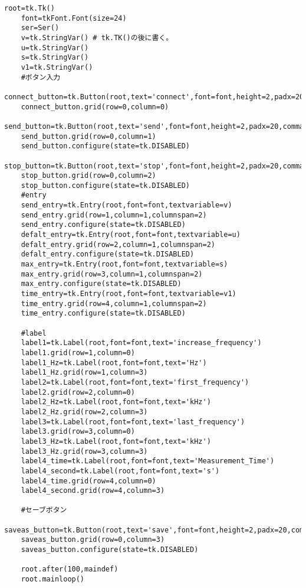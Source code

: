 \documentclass[12pt]{jarticle}
\begin{document}
\begin{lstlisting}[caption = GUIプログラム , label = program1]
	root=tk.Tk()
	font=tkFont.Font(size=24)
	ser=Ser() 
	v=tk.StringVar() # tk.TK()の後に書く。
	u=tk.StringVar()
	s=tk.StringVar()
	v1=tk.StringVar()
	#ボタン入力
	connect_button=tk.Button(root,text='connect',font=font,height=2,padx=20,command=ser.connect)
	connect_button.grid(row=0,column=0)
	send_button=tk.Button(root,text='send',font=font,height=2,padx=20,command=ser.send_com)
	send_button.grid(row=0,column=1)
	send_button.configure(state=tk.DISABLED)
	stop_button=tk.Button(root,text='stop',font=font,height=2,padx=20,command=ser.stop_com)
	stop_button.grid(row=0,column=2)
	stop_button.configure(state=tk.DISABLED)
	#entry
	send_entry=tk.Entry(root,font=font,textvariable=v)
	send_entry.grid(row=1,column=1,columnspan=2)
	send_entry.configure(state=tk.DISABLED)
	defalt_entry=tk.Entry(root,font=font,textvariable=u)
	defalt_entry.grid(row=2,column=1,columnspan=2)
	defalt_entry.configure(state=tk.DISABLED)
	max_entry=tk.Entry(root,font=font,textvariable=s)
	max_entry.grid(row=3,column=1,columnspan=2)
	max_entry.configure(state=tk.DISABLED)
	time_entry=tk.Entry(root,font=font,textvariable=v1)
	time_entry.grid(row=4,column=1,columnspan=2)
	time_entry.configure(state=tk.DISABLED)
	
	#label
	label1=tk.Label(root,font=font,text='increase_frequency')
	label1.grid(row=1,column=0)
	label1_Hz=tk.Label(root,font=font,text='Hz')
	label1_Hz.grid(row=1,column=3)
	label2=tk.Label(root,font=font,text='first_frequency')
	label2.grid(row=2,column=0)
	label2_Hz=tk.Label(root,font=font,text='kHz')
	label2_Hz.grid(row=2,column=3)
	label3=tk.Label(root,font=font,text='last_frequency')
	label3.grid(row=3,column=0)
	label3_Hz=tk.Label(root,font=font,text='kHz')
	label3_Hz.grid(row=3,column=3)
	label4_time=tk.Label(root,font=font,text='Measurement_Time')
	label4_second=tk.Label(root,font=font,text='s')
	label4_time.grid(row=4,column=0)
	label4_second.grid(row=4,column=3)
	
	#セーブボタン
	saveas_button=tk.Button(root,text='save',font=font,height=2,padx=20,command=saveas)
	saveas_button.grid(row=0,column=3)
	saveas_button.configure(state=tk.DISABLED)
	
	root.after(100,maindef)
	root.mainloop()   
	
	
	\end{lstlisting}
	
	
\end{document}
